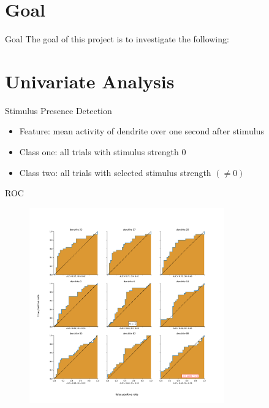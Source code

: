 \documentclass[10pt]{beamer}
\begin{document}
\section{Goal}
\begin{frame}[fragile]{Goal}
The goal of this project is to investigate the following:
\begin{itemize}
\end{itemize}
\end{frame}

\section{Univariate Analysis}

\begin{frame}[fragile]{Stimulus Presence Detection}
\begin{itemize}
\item Feature: mean activity of dendrite over one second after stimulus
\item Class one: all trials with stimulus strength 0
\item Class two: all trials with selected stimulus strength $(\neq 0)$
\end{itemize}
\end{frame}

\begin{frame}[fragile]{ROC}
\begin{center}
	\begin{figure}
      \includegraphics[width=0.75\textwidth]{roc_max.png}
	\end{figure}
	\end{center}
\end{frame}
\end{document}
